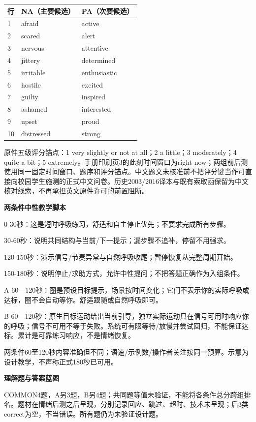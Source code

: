 \documentclass[11pt,a4paper]{article}
\newcommand{\reviewsubsection}[1]{\par\Needspace{4\baselineskip}\begin{center}{\titlelatin\titlecjk\bfseries\fontsize{12}{18}\selectfont #1}\end{center}}
\begin{document}
\begin{longtable}{L{15mm}L{60mm}L{60mm}}
行 & NA（主要候选） & PA（次要候选）\\ & afraid & active\\
2 & scared & alert\\
3 & nervous & attentive\\
4 & jittery & determined\\
5 & irritable & enthusiastic\\
6 & hostile & excited\\
7 & guilty & inspired\\
8 & ashamed & interested\\
9 & upset & proud\\
10 & distressed & strong\\
\end{longtable}

原件五级评分锚点：1 very slightly or not at all；2 a little；3 moderately；4 quite a bit；5 extremely。手册印刷页3的此刻时间窗口为right now；两组前后测使用同一固定时间窗口、题序和评分锚点。中文题文未核准前不把评分键当作可直接向校园学生施测的正式中文问卷。历史2003/2016译本与既有索取函保留为中文核对线索，不再承担英文原件许可的前置阻断。

\reviewsubsection{7.2 两条件中性教学脚本}
0-\allowbreak{}30秒：这是短时呼吸练习，舒适和自主停止优先；不要求完成所有步骤。

30-\allowbreak{}60秒：说明共同结构与当前/\allowbreak{}下一提示；漏步骤不追补，停留不用强求。

120-\allowbreak{}150秒：演示信号/\allowbreak{}节奏异常与自然呼吸收尾；暂停恢复从完整周期开始。

150-\allowbreak{}180秒：说明停止/\allowbreak{}求助方式，允许中性提问；不把答题正确作为入组条件。

A 60—120秒：圈是预设目标提示，场景按时间变化；它们不表示你的实际呼吸或达标，圈不会自动等你。舒适跟随或自然呼吸即可。

B 60—120秒：原生目标运动给出当前引导，独立实际运动只在信号可用时响应你的呼吸；信号不可用不等于失败。系统可有限等待/\allowbreak{}放慢并尝试回归，不能保证达标。累计是可靠练习响应，不是情绪恢复。

两条件60至120秒内容准确但不同；语速/\allowbreak{}示例数/\allowbreak{}操作者关注按同一预算。示意为设计教学，不声称正式180秒已可用。

\reviewsubsection{7.3 理解题与答案蓝图}
COMMON4题，A另3题，B另4题；共同题等值未验证，不能将各条件总分跨组排名。题材在情绪后测之后呈现，分别记录回应、跳过、超时、技术未呈现；后3类correct为空，不当错误。所有题仍为未验证设计题。
\end{document}
